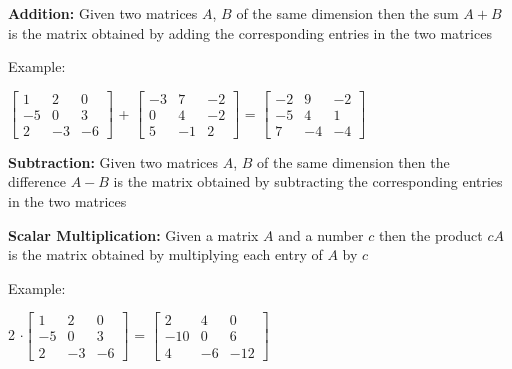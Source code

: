 \documentclass[12pt]{article}
\newenvironment{myindentpar}[1]%
     {\begin{list}{}%
             {\setlength{\leftmargin}{#1}}%
             \item[]%
     }
     {\end{list}}
\begin{document}
\begin{itemize}
\item \textbf{Addition:} Given two matrices $A$, $B$ of the same dimension then the sum $A + B$ is the matrix obtained by adding the corresponding entries in the two matrices
\begin{myindentpar}{1cm}
Example: 

$\begin{bmatrix}                                        
       1 & 2 & 0           \\[1em]			
       -5 & 0           & 3 \\[1em]       		
       2           & -3 & -6				
     \end{bmatrix}$
+ 			 
$\begin{bmatrix}                                        
       -3 & 7 & -2           \\[1em]			
       0 & 4           & -2 \\[1em]       		
       5           & -1 & 2				
     \end{bmatrix}$
= 
$\begin{bmatrix}                                        
       -2 & 9 & -2           \\[1em]			
       -5 & 4           & 1 \\[1em]       		
       7           & -4 & -4				
     \end{bmatrix}$
\end{myindentpar}
\item \textbf{Subtraction:} Given two matrices $A$, $B$ of the same dimension then the difference $A - B$ is the matrix obtained by subtracting the corresponding entries in the two matrices
\item \textbf{Scalar Multiplication:} Given a matrix $A$ and a number $c$ then the product $cA$ is the matrix obtained by multiplying each entry of $A$ by $c$
\end{itemize}


\begin{myindentpar}{1cm}
Example:

2 $\cdot \begin{bmatrix}                                        
       1 & 2 & 0           \\[1em]			
       -5 & 0           & 3 \\[1em]       		
       2           & -3 & -6				
     \end{bmatrix}$
= 
$\begin{bmatrix}                                        
       2 & 4 & 0           \\[1em]			
       -10 & 0           & 6 \\[1em]       		
       4           & -6 & -12				
     \end{bmatrix}$
\end{myindentpar}
\end{document}
